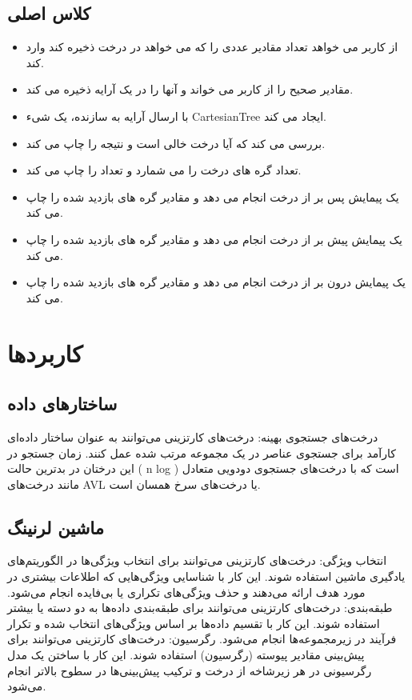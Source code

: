 \documentclass{article}
\begin{document}
\subsection{کلاس اصلی}
\begin{itemize}
    \item از کاربر می خواهد تعداد مقادیر عددی را که می خواهد در درخت ذخیره کند وارد کند.
    \item مقادیر صحیح را از کاربر می خواند و آنها را در یک آرایه ذخیره می کند.
    \item با ارسال آرایه به سازنده، یک شیء CartesianTree ایجاد می کند.
    \item بررسی می کند که آیا درخت خالی است و نتیجه را چاپ می کند.
    \item تعداد گره های درخت را می شمارد و تعداد را چاپ می کند.
    \item یک پیمایش پس بر از درخت انجام می دهد و مقادیر گره های بازدید شده را چاپ می کند.
    \item یک پیمایش پیش بر از درخت انجام می دهد و مقادیر گره های بازدید شده را چاپ می کند.
    \item یک پیمایش درون بر از درخت انجام می دهد و مقادیر گره های بازدید شده را چاپ می کند.
\end{itemize}
\section{کاربردها}
\subsection{ ساختارهای داده}
درخت‌های جستجوی بهینه: درخت‌های کارتزینی می‌توانند به عنوان ساختار داده‌ای کارآمد برای جستجوی عناصر در یک مجموعه مرتب شده عمل کنند. زمان جستجو در این درختان در بدترین حالت ( n log ) است که با درخت‌های جستجوی دودویی متعادل مانند درخت‌های AVL یا درخت‌های سرخ همسان است.
\subsection{ماشین لرنینگ}
انتخاب ویژگی: درخت‌های کارتزینی می‌توانند برای انتخاب ویژگی‌ها در الگوریتم‌های یادگیری ماشین استفاده شوند. این کار با شناسایی ویژگی‌هایی که اطلاعات بیشتری در مورد هدف ارائه می‌دهند و حذف ویژگی‌های تکراری یا بی‌فایده انجام می‌شود.
\newline طبقه‌بندی: درخت‌های کارتزینی می‌توانند برای طبقه‌بندی داده‌ها به دو دسته یا بیشتر استفاده شوند. این کار با تقسیم داده‌ها بر اساس ویژگی‌های انتخاب شده و تکرار فرآیند در زیرمجموعه‌ها انجام می‌شود.
\newline رگرسیون: درخت‌های کارتزینی می‌توانند برای پیش‌بینی مقادیر پیوسته (رگرسیون) استفاده شوند. این کار با ساختن یک مدل رگرسیونی در هر زیرشاخه از درخت و ترکیب پیش‌بینی‌ها در سطوح بالاتر انجام می‌شود.
\end{document}
